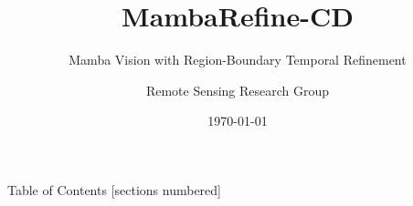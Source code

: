 \documentclass[10pt]{beamer}
\title{MambaRefine-CD}
\subtitle{Mamba Vision with Region-Boundary Temporal Refinement}
\author{Remote Sensing Research Group}
\institute{Multidisciplinary AI Research Center (MARC) \\ University of Peradeniya}
\date{\today}
\begin{document}
\maketitle

\begin{frame}{Table of Contents}
  [sections numbered]
  \tableofcontents[hideallsubsections]
\end{frame}







\end{document}
